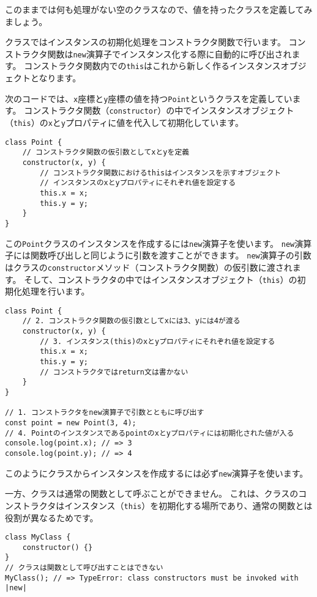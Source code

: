 このままでは何も処理がない空のクラスなので、値を持ったクラスを定義してみましょう。

クラスではインスタンスの初期化処理をコンストラクタ関数で行います。
コンストラクタ関数は\texttt{new}演算子でインスタンス化する際に自動的に呼び出されます。
コンストラクタ関数内での\texttt{this}はこれから新しく作るインスタンスオブジェクトとなります。

次のコードでは、\texttt{x}座標と\texttt{y}座標の値を持つ\texttt{Point}というクラスを定義しています。
コンストラクタ関数（\texttt{constructor}）の中でインスタンスオブジェクト（\texttt{this}）の\texttt{x}と\texttt{y}プロパティに値を代入して初期化しています。

\begin{lstlisting}
class Point {
    // コンストラクタ関数の仮引数としてxとyを定義
    constructor(x, y) {
        // コンストラクタ関数におけるthisはインスタンスを示すオブジェクト
        // インスタンスのxとyプロパティにそれぞれ値を設定する
        this.x = x;
        this.y = y;
    }
}
\end{lstlisting}

この\texttt{Point}クラスのインスタンスを作成するには\texttt{new}演算子を使います。
\texttt{new}演算子には関数呼び出しと同じように引数を渡すことができます。
\texttt{new}演算子の引数はクラスの\texttt{constructor}メソッド（コンストラクタ関数）の仮引数に渡されます。
そして、コンストラクタの中ではインスタンスオブジェクト（\texttt{this}）の初期化処理を行います。

\begin{lstlisting}
class Point {
    // 2. コンストラクタ関数の仮引数としてxには3、yには4が渡る
    constructor(x, y) {
        // 3. インスタンス(this)のxとyプロパティにそれぞれ値を設定する
        this.x = x;
        this.y = y;
        // コンストラクタではreturn文は書かない
    }
}

// 1. コンストラクタをnew演算子で引数とともに呼び出す
const point = new Point(3, 4);
// 4. Pointのインスタンスであるpointのxとyプロパティには初期化された値が入る
console.log(point.x); // => 3
console.log(point.y); // => 4
\end{lstlisting}

このようにクラスからインスタンスを作成するには必ず\texttt{new}演算子を使います。

一方、クラスは通常の関数として呼ぶことができません。
これは、クラスのコンストラクタはインスタンス（\texttt{this}）を初期化する場所であり、通常の関数とは役割が異なるためです。

\begin{lstlisting}
class MyClass {
    constructor() {}
}
// クラスは関数として呼び出すことはできない
MyClass(); // => TypeError: class constructors must be invoked with |new|
\end{lstlisting}

